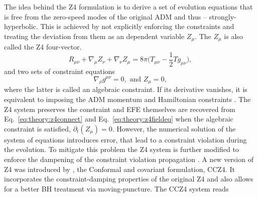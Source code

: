 The idea behind the Z4 formulation is to derive a set of evolution equations that is free from the 
zero-speed modes of the original \ac{ADM} and thus -- strongly-hyperbolic. 
This is achieved by not explicitly enforcing the constraints and treating the deviation 
from them as an dependent variable $Z_{\mu}$. 
The $Z_{\mu}$ is also called the Z4 four-vector.
%
\begin{equation}
    R_{\mu\nu} + \nabla_{\mu}Z_{\nu} + \nabla_{\nu}Z_{\mu}=8\pi\Big(T_{\mu\nu} - \frac{1}{2}Tg_{\mu\nu}\Big),
    \label{eq:theory:z4fieldeq}
\end{equation}
%
and two sets of constraint equations
%
\begin{equation}
    \nabla_{\rho} g^{\mu\nu} = 0, \text{ and } Z_{\mu} = 0,
    \label{eq:theory:z4connect}
\end{equation}
%
where the latter is called an algebraic constraint. If its derivative vanishes,
it is equivalent to imposing the \ac{ADM} momentum and Hamiltonian constraints \citep{Bona:2009}. 
%
The Z4 system preserves the constraint and \ac{EFE} themselves are recovered 
from Eq.~\eqref{eq:theory:z4connect} and Eq.~\eqref{eq:theory:z4fieldeq} when the algebraic 
constraint is satisfied, $\partial_t (Z_{\mu})= 0$. 
%
However, the numerical solution of the system of equations introduces error, 
that lead to a constraint violation during the evolution. 
To mitigate this problem the Z4 system is further modified to enforce the 
dampening of the constraint violation propagation \citep{Gundlach:2005eh}.
%
A new version of Z4 was introduced by \citet{Alic:2011gg}, the 
Conformal and covariant formulation, CCZ4. 
It incorporates the constraint-damping properties of the original Z4 
and also allows for a better \ac{BH} treatment via moving-puncture.
The CCZ4 system reads 
%
